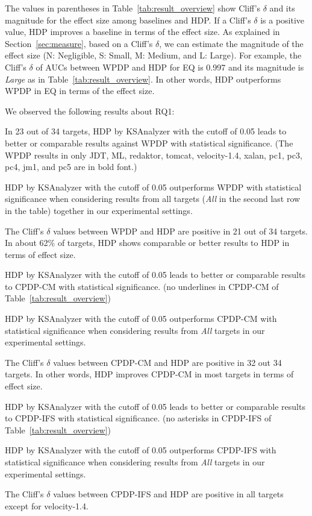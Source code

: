 The values in parentheses in Table~\ref{tab:result_overview} show Cliff's $\delta$ and its magnitude for the effect size among baselines and HDP. If a Cliff's $\delta$ is a positive value, HDP improves a baseline in terms of the effect size. As explained in Section~\ref{sec:measure}, based on a Cliff's $\delta$, we can estimate the magnitude of the effect size (N: Negligible, S: Small, M: Medium, and L: Large). For example, the Cliff's $\delta$ of AUCs between WPDP and HDP for EQ is 0.997 and its magnitude is {\em Large} as in Table~\ref{tab:result_overview}. In other words, HDP outperforms WPDP in EQ in terms of the effect size.

We observed the following results about RQ1:
\squishlist
	\item In 23 out of 34 targets, HDP by KSAnalyzer with the cutoff of
	0.05 leads to better or comparable results against WPDP with statistical
	significance. (The WPDP results in only JDT, ML, redaktor, tomcat, velocity-1.4, xalan, pc1, pc3, pc4, jm1, and pc5 are in bold font.)
	\item HDP by KSAnalyzer with the cutoff of 0.05 outperforms
	WPDP with statistical significance when considering
	results from all targets ({\em All} in the second last row in the table) together in
	our experimental settings.
	\item The Cliff's $\delta$ values between WPDP and HDP are positive in 21 out of 34 targets. In about 62\% of targets, HDP shows comparable or better results to HDP in terms of effect size.
	\item HDP by KSAnalyzer with the cutoff of 0.05
	leads to better or comparable results to CPDP-CM
	with statistical significance. (no underlines in CPDP-CM of
	Table~\ref{tab:result_overview})
	\item HDP by KSAnalyzer with the cutoff of 0.05 outperforms
	CPDP-CM with statistical significance
	when considering results from {\em All} targets in our experimental
	settings.
	\item The Cliff's $\delta$ values between CPDP-CM and HDP are positive in 32 out 34 targets. In other words, HDP improves CPDP-CM in most targets in terms of effect size.
	\item HDP by KSAnalyzer with the cutoff of 0.05
	leads to better or comparable results to CPDP-IFS with
	statistical significance. (no asterisks in CPDP-IFS of
	Table~\ref{tab:result_overview})
	\item HDP by KSAnalyzer with the cutoff of 0.05 outperforms
	CPDP-IFS with statistical significance
	when considering results from {\em All} targets in our experimental
	settings.
	\item The Cliff's $\delta$ values between CPDP-IFS and HDP are positive in all targets except for velocity-1.4.
\squishend

